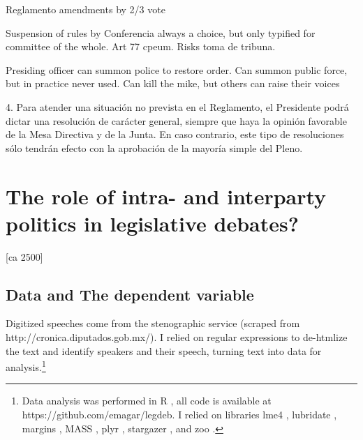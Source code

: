 \documentclass[letter,12pt]{article}
\begin{document}
Reglamento amendments by 2/3 vote

Suspension of rules by Conferencia always a choice, but only typified for committee of the whole. Art 77 cpeum. Risks toma de tribuna.

Presiding officer can summon police to restore order. 
Can summon public force, but in practice never used. 
Can kill the mike, but others can raise their voices

4. Para atender una situación no prevista en el Reglamento, el Presidente podrá dictar una resolución de carácter general, siempre que haya la opinión favorable de la Mesa Directiva y de la Junta. En caso contrario, este tipo de resoluciones sólo tendrán efecto con la aprobación de la mayoría simple del Pleno.

\section{The role of intra- and interparty politics in legislative debates?} [ca 2500]
 

  \subsection{Data and The dependent variable}

Digitized speeches come from the stenographic service (scraped from http://cronica.diputados.gob.mx/). I relied on regular expressions to de-htmlize the text and identify speakers and their speech, turning text into data for analysis.\footnote{Data analysis was performed in R \citep{r.cite}, all code is available at https://github.com/emagar/legdeb. I relied on libraries lme4 \citep{r.lme4}, lubridate \citep{r.lubridate}, margins \citep{r.margins}, MASS \citep{r.mass}, plyr \citep{r.plyr}, stargazer \citep{r.stargazer}, and zoo \citep{r.zoo}.}

 
\end{document}
